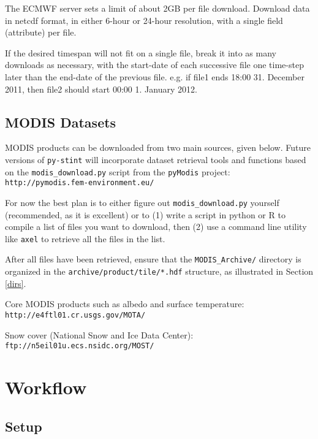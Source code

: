 \documentclass[twoside,a4paper]{refart}
\begin{document}
\attention
The ECMWF server sets a limit of about 2GB per file download.  Download data in netcdf format, in either 6-hour or 24-hour resolution, with a single field (attribute) per file. 

If the desired timespan will not fit on a single file, break it into as many downloads as necessary, with the start-date of each successive file one time-step later than the end-date of the previous file. e.g. if file1 ends 18:00 31. December 2011, then file2 should start 00:00 1. January 2012.

\subsection{MODIS Datasets}\label{modis}
MODIS products can be downloaded from two main sources, given below.  Future versions of \texttt{py-stint} will incorporate dataset retrieval tools and functions based on the \texttt{modis\_download.py} script from the \texttt{pyModis} project:
\texttt{http://pymodis.fem-environment.eu/}

For now the best plan is to either figure out \texttt{modis\_download.py} yourself (recommended, as it is excellent) or to (1) write a script in python or R to compile a list of files you want to download, then (2) use a command line utility like \texttt{axel} to retrieve all the files in the list.

After all files have been retrieved, ensure that the \texttt{MODIS\_Archive/} directory is organized in the \texttt{archive/product/tile/*.hdf} structure, as illustrated in Section \ref{dirs}. 

Core MODIS products such as albedo and surface temperature:\\
\texttt{http://e4ftl01.cr.usgs.gov/MOTA/}


Snow cover (National Snow and Ice Data Center):\\
\texttt{ftp://n5eil01u.ecs.nsidc.org/MOST/}


\section{Workflow}\label{run}

\subsection{Setup}
\end{document}

